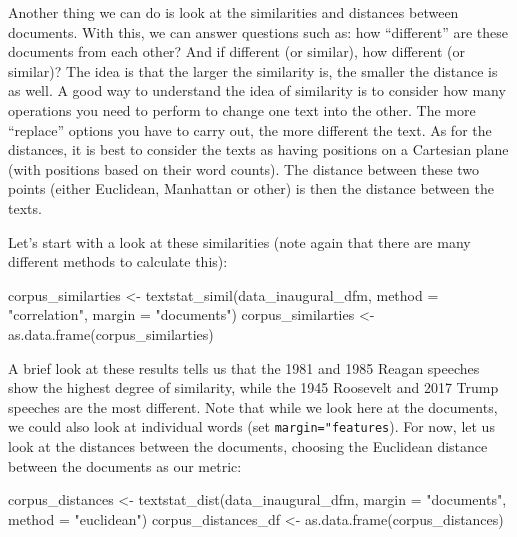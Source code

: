 \documentclass[
]{article}
\newenvironment{Shaded}{\begin{snugshade}}{\end{snugshade}}
\newcommand{\AttributeTok}[1]{\textcolor[rgb]{0.77,0.63,0.00}{#1}}
\newcommand{\FunctionTok}[1]{\textcolor[rgb]{0.00,0.00,0.00}{#1}}
\newcommand{\NormalTok}[1]{#1}
\newcommand{\OtherTok}[1]{\textcolor[rgb]{0.56,0.35,0.01}{#1}}
\newcommand{\StringTok}[1]{\textcolor[rgb]{0.31,0.60,0.02}{#1}}
\begin{document}
Another thing we can do is look at the similarities and distances between documents. With this, we can answer questions such as: how ``different'' are these documents from each other? And if different (or similar), how different (or similar)? The idea is that the larger the similarity is, the smaller the distance is as well. A good way to understand the idea of similarity is to consider how many operations you need to perform to change one text into the other. The more ``replace'' options you have to carry out, the more different the text. As for the distances, it is best to consider the texts as having positions on a Cartesian plane (with positions based on their word counts). The distance between these two points (either Euclidean, Manhattan or other) is then the distance between the texts.

Let's start with a look at these similarities (note again that there are many different methods to calculate this):

\begin{Shaded}
\begin{Highlighting}[]
\NormalTok{corpus\_similarties }\OtherTok{\textless{}{-}} \FunctionTok{textstat\_simil}\NormalTok{(data\_inaugural\_dfm, }\AttributeTok{method =} \StringTok{"correlation"}\NormalTok{, }\AttributeTok{margin =} \StringTok{"documents"}\NormalTok{)}
\NormalTok{corpus\_similarties }\OtherTok{\textless{}{-}} \FunctionTok{as.data.frame}\NormalTok{(corpus\_similarties)}
\end{Highlighting}
\end{Shaded}

A brief look at these results tells us that the 1981 and 1985 Reagan speeches show the highest degree of similarity, while the
1945 Roosevelt and 2017 Trump speeches are the most different. Note that while we look here at the documents, we could also look at individual words (set \texttt{margin="features}). For now, let us look at the distances between the documents, choosing the Euclidean distance between the documents as our metric:

\begin{Shaded}
\begin{Highlighting}[]
\NormalTok{corpus\_distances }\OtherTok{\textless{}{-}} \FunctionTok{textstat\_dist}\NormalTok{(data\_inaugural\_dfm, }\AttributeTok{margin =} \StringTok{"documents"}\NormalTok{, }\AttributeTok{method =} \StringTok{"euclidean"}\NormalTok{)}
\NormalTok{corpus\_distances\_df }\OtherTok{\textless{}{-}} \FunctionTok{as.data.frame}\NormalTok{(corpus\_distances)}
\end{Highlighting}
\end{Shaded}
\end{document}
